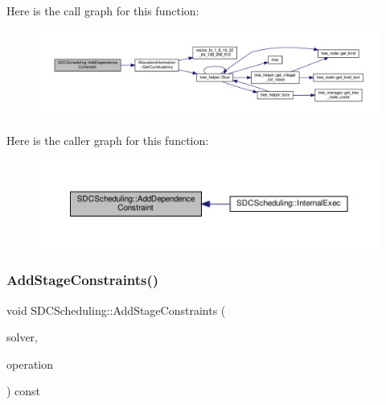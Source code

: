 Here is the call graph for this function\+:
\nopagebreak
\begin{figure}[H]
\begin{center}
\leavevmode
\includegraphics[width=350pt]{d4/dc5/classSDCScheduling_a1ba2f8b6af879bd8e641a0604ecaf70c_cgraph}
\end{center}
\end{figure}
Here is the caller graph for this function\+:
\nopagebreak
\begin{figure}[H]
\begin{center}
\leavevmode
\includegraphics[width=350pt]{d4/dc5/classSDCScheduling_a1ba2f8b6af879bd8e641a0604ecaf70c_icgraph}
\end{center}
\end{figure}
\mbox{\label{classSDCScheduling_a39750be65287d266d7cf259d91667246}} 
\subsubsection{\texorpdfstring{Add\+Stage\+Constraints()}{AddStageConstraints()}}
{\footnotesize\ttfamily void S\+D\+C\+Scheduling\+::\+Add\+Stage\+Constraints (\begin{DoxyParamCaption}\item[{const meilp\+\_\+solver\+Ref}]{solver,  }\item[{const \hyperlink{graph_8hpp_abefdcf0544e601805af44eca032cca14}{vertex}}]{operation }\end{DoxyParamCaption}) const\hspace{0.3cm}{\ttfamily [protected]}}



